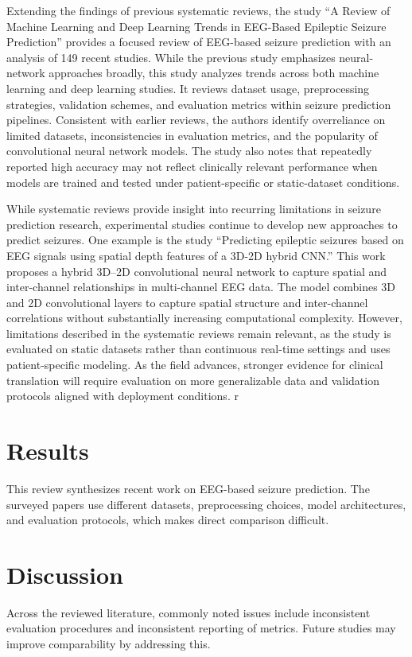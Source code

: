 \documentclass[conference]{IEEEtran}
\begin{document}
Extending the findings of previous systematic reviews, the study ``A Review of Machine Learning and Deep Learning Trends in EEG-Based Epileptic Seizure Prediction'' provides a focused review of EEG-based seizure prediction with an analysis of 149 recent studies. While the previous study emphasizes neural-network approaches broadly, this study analyzes trends across both machine learning and deep learning studies. It reviews dataset usage, preprocessing strategies, validation schemes, and evaluation metrics within seizure prediction pipelines. Consistent with earlier reviews, the authors identify overreliance on limited datasets, inconsistencies in evaluation metrics, and the popularity of convolutional neural network models. The study also notes that repeatedly reported high accuracy may not reflect clinically relevant performance when models are trained and tested under patient-specific or static-dataset conditions.

While systematic reviews provide insight into recurring limitations in seizure prediction research, experimental studies continue to develop new approaches to predict seizures. One example is the study ``Predicting epileptic seizures based on EEG signals using spatial depth features of a 3D-2D hybrid CNN.'' This work proposes a hybrid 3D--2D convolutional neural network to capture spatial and inter-channel relationships in multi-channel EEG data. The model combines 3D and 2D convolutional layers to capture spatial structure and inter-channel correlations without substantially increasing computational complexity. However, limitations described in the systematic reviews remain relevant, as the study is evaluated on static datasets rather than continuous real-time settings and uses patient-specific modeling. As the field advances, stronger evidence for clinical translation will require evaluation on more generalizable data and validation protocols aligned with deployment conditions.
r
\section{Results}
\noindent This review synthesizes recent work on EEG-based seizure prediction. The surveyed papers use different datasets, preprocessing choices, model architectures, and evaluation protocols, which makes direct comparison difficult.

\section{Discussion}
\noindent Across the reviewed literature, commonly noted issues include inconsistent evaluation procedures and inconsistent reporting of metrics. Future studies may improve comparability by addressing this.
\end{document}
